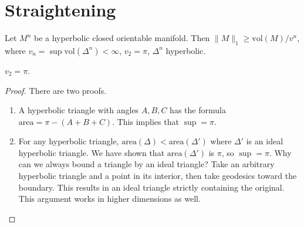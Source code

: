 \section{Straightening} 
\begin{theorem}\label{volhyper} 
    Let $M^n $ be a hyperbolic closed orientable manifold. Then $\|M\|_1 \geq \mathrm{vol}(M) / v^n $, where $v_n  =\sup \mathrm{vol}(\Delta ^n )< \infty$, $v_2=\pi$, $\Delta ^n $ hyperbolic.
\end{theorem}
\begin{lemma}
    $v_2=\pi$.
\end{lemma}
\begin{proof}
    There are two proofs.
    \begin{enumerate}[label=(\arabic*)]
    \setlength\itemsep{-.2em}
\item A hyperbolic triangle with angles $A,B,C$ has the formula $\mathrm{area}=\pi-(A+B+C)$. This implies that $\sup =\pi$.
\item For any hyperbolic triangle, $\mathrm{area}(\Delta )< \mathrm{area}(\Delta ')$ where $\Delta '$ is an ideal hyperbolic triangle. We have shown that $\mathrm{area}(\Delta ')$ is $\pi$, so $\sup=\pi$. Why can we always bound a triangle by an ideal triangle? Take an arbitrary hyperbolic triangle and a point in its interior, then take geodesics toward the boundary. This results in an ideal triangle strictly containing the original. This argument works in higher dimensions as well.\qedhere
    \end{enumerate}
\end{proof}

